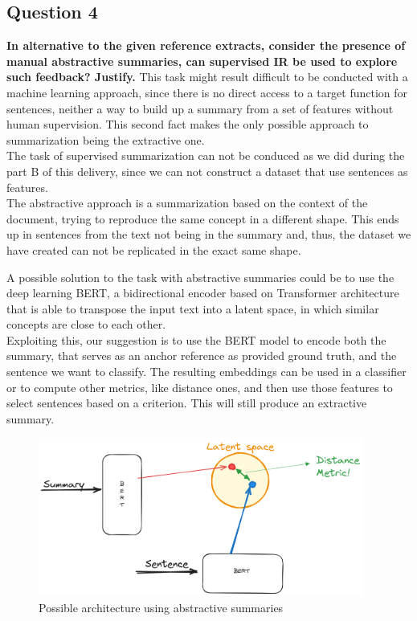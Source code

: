 \subsection{Question 4}
\textbf{In alternative to the given reference extracts, consider the presence of manual abstractive summaries, can supervised IR be used to explore such feedback? Justify.}
This task might result difficult to be conducted with a machine learning approach, since there is no direct access to a target function for sentences, neither a way to build up a summary from a set of features without human supervision. This second fact makes the only possible approach to summarization being the extractive one. \\
The task of supervised summarization can not be conduced as we did during the part B of this delivery, since we can not construct a dataset that use sentences as features.\\
The abstractive approach is a summarization based on the context of the document, trying to reproduce the same concept in a different shape. This ends up in sentences from the text not being in the summary and, thus, the dataset we have created can not be replicated in the exact same shape. 

A possible solution to the task with abstractive summaries could be to use the deep learning BERT, a bidirectional encoder based on Transformer architecture that is able to transpose the input text into a latent space, in which similar concepts are close to each other. \\
Exploiting this, our suggestion is to use the BERT model to encode both the summary, that serves as an anchor reference as provided ground truth, and the sentence we want to classify. The resulting embeddings can be used in a classifier or to compute other metrics, like distance ones, and then use those features to select sentences based on a criterion. This will still produce an extractive summary.
\begin{figure}[H]
  \centering
  \includegraphics[width=0.95\textwidth]{images/abstractive.png}
  \caption{Possible architecture using abstractive summaries}
  \label{fig:abstractive}
\end{figure} 

